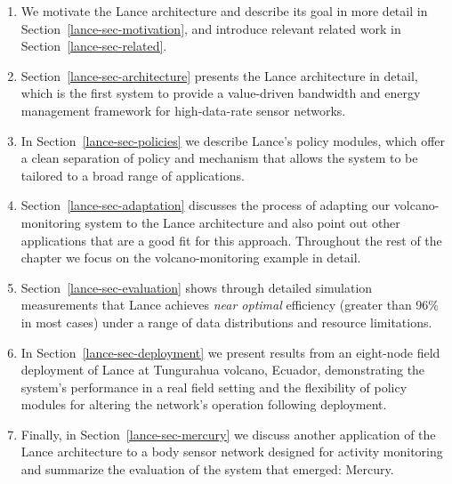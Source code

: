 \begin{enumerate}

\item We motivate the Lance architecture and describe its goal in more detail
in Section~\ref{lance-sec-motivation}, and introduce relevant related work in
Section~\ref{lance-sec-related}.

\item Section~\ref{lance-sec-architecture} presents the Lance architecture in
detail, which is the first system to provide a value-driven bandwidth and
energy management framework for high-data-rate sensor networks.

\item In Section~\ref{lance-sec-policies} we describe Lance's policy modules,
which offer a clean separation of policy and mechanism that allows the system
to be tailored to a broad range of applications.

\item Section~\ref{lance-sec-adaptation} discusses the process of
adapting our volcano-monitoring system to the Lance architecture and also
point out other applications that are a good fit for this approach.
Throughout the rest of the chapter we focus on the volcano-monitoring example
in detail.

\item Section~\ref{lance-sec-evaluation} shows through detailed simulation
measurements that Lance achieves \textit{near optimal} efficiency (greater
than 96\% in most cases) under a range of data distributions and resource
limitations.

\item In Section~\ref{lance-sec-deployment} we present results from an
eight-node field deployment of Lance at Tungurahua volcano, Ecuador,
demonstrating the system's performance in a real field setting and the
flexibility of policy modules for altering the network's operation following
deployment.

\item Finally, in Section~\ref{lance-sec-mercury} we discuss another
application of the Lance architecture to a body sensor network designed for
activity monitoring and summarize the evaluation of the system that emerged:
Mercury.

\end{enumerate}
